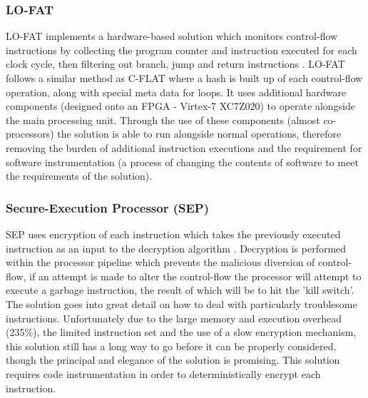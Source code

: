 \subsubsection{LO-FAT}
LO-FAT implements a hardware-based solution which monitors control-flow instructions by collecting the program counter and instruction executed for each clock cycle, then filtering out branch, jump and return instructions \cite{Dessouky2017}. LO-FAT follows a similar method as C-FLAT where a hash is built up of each control-flow operation, along with special meta data for loops. It uses additional hardware components (designed onto an FPGA - Virtex-7 XC7Z020) to operate alongside the main processing unit. Through the use of these components (almost co-processors) the solution is able to run alongside normal operations, therefore removing the burden of additional instruction executions and the requirement for software instrumentation (a process of changing the contents of software to meet the requirements of the solution).

\subsubsection{Secure-Execution Processor (SEP)}
SEP uses encryption of each instruction which takes the previously executed instruction as an input to the decryption algorithm \cite{Lee2019}. Decryption is performed within the processor pipeline which prevents the malicious diversion of control-flow, if an attempt is made to alter the control-flow the processor will attempt to execute a garbage instruction, the result of which will be to hit the 'kill switch'. The solution goes into great detail on how to deal with particularly troublesome instructions. Unfortunately due to the large memory and execution overhead (235\%), the limited instruction set and the use of a slow encryption mechanism, this solution still has a long way to go before it can be properly considered, though the principal and elegance of the solution is promising. This solution requires code instrumentation in order to deterministically encrypt each instruction.

